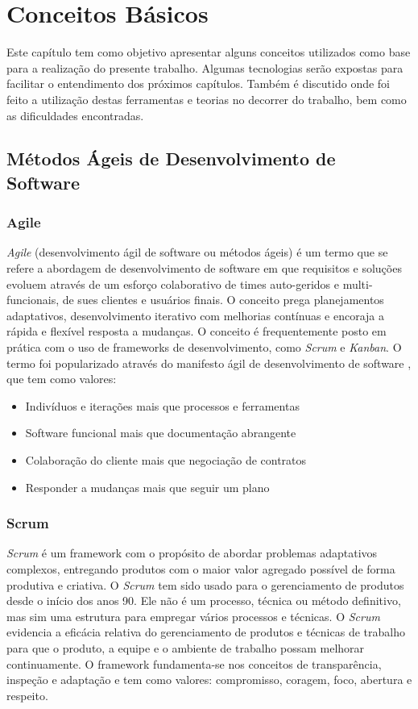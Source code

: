 \chapter{Conceitos Básicos}
Este capítulo tem como objetivo apresentar alguns conceitos utilizados como base para a realização do presente trabalho. Algumas tecnologias serão expostas para facilitar o entendimento dos próximos capítulos. Também é discutido onde foi feito a utilização destas ferramentas e teorias no decorrer do trabalho, bem como as dificuldades encontradas.

\section{Métodos Ágeis de Desenvolvimento de Software}

\subsection{Agile}
\textit{Agile} (desenvolvimento ágil de software ou métodos ágeis) é um termo que se refere a abordagem de desenvolvimento de software em que requisitos e soluções evoluem através de um esforço colaborativo de times auto-geridos e multi-funcionais, de sues clientes e usuários finais. O conceito prega planejamentos adaptativos, desenvolvimento iterativo com melhorias contínuas e encoraja a rápida e flexível resposta a mudanças. O conceito é frequentemente posto em prática com o uso de frameworks de desenvolvimento, como \textit{Scrum} e \textit{Kanban}. O termo foi popularizado através do manifesto ágil de desenvolvimento de software , que tem como valores:

\begin{itemize}
    \item Indivíduos e iterações mais que processos e ferramentas
    \item Software funcional mais que documentação abrangente
    \item Colaboração do cliente mais que negociação de contratos
    \item Responder a mudanças mais que seguir um plano
\end{itemize}

\subsection{Scrum}

\textit{Scrum} é um framework com o propósito de abordar problemas adaptativos complexos, entregando produtos com o maior valor agregado possível de forma produtiva e criativa. O \textit{Scrum} tem sido usado para o gerenciamento de produtos desde o início dos anos 90. Ele não é um processo, técnica ou método definitivo, mas sim uma estrutura para empregar vários processos e técnicas. O \textit{Scrum} evidencia a eficácia relativa do gerenciamento de produtos e técnicas de trabalho para que o produto, a equipe e o ambiente de trabalho possam melhorar continuamente. O framework fundamenta-se nos conceitos de transparência, inspeção e adaptação e tem como valores: compromisso, coragem, foco, abertura e respeito.

